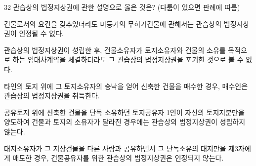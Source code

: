 \begin{question}{32}
관습상의 법정지상권에 관한 설명으로 옳은 것은? (다툼이 있으면 판례에 따름)
\begin{choices}
  \item 건물로서의 요건을 갖추었더라도 미등기의 무허가건물에 관해서는 관습상의 법정지상권이 인정될 수 없다.
  \item 관습상의 법정지상권이 성립한 후, 건물소유자가 토지소유자와 건물의 소유를 목적으로 하는 임대차계약을 체결하더라도 그 관습상의 법정지상권을 포기한 것으로 볼 수 없다.
  \item 타인의 토지 위에 그 토지소유자의 승낙을 얻어 신축한 건물을 매수한 경우, 매수인은 관습상의 법정지상권을 취득한다.
  \item 공유토지 위에 신축한 건물을 단독 소유하던 토지공유자 1인이 자신의 토지지분만을 양도하여 건물과 토지의 소유자가 달라진 경우에는 관습상의 법정지상권이 성립하지 않는다.
  \item 대지소유자가 그 지상건물을 다른 사람과 공유하면서 그 단독소유의 대지만을 제3자에게 매도한 경우, 건물공유자를 위한 관습상의 법정지상권은 인정되지 않는다.
\end{choices}
\end{question}
